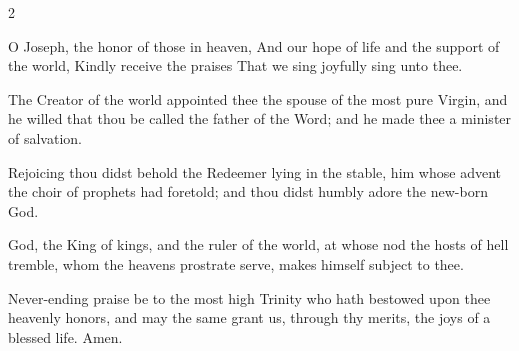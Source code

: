 \begin{multicols}{2}
\raggedcolumns
\begin{enpars}
O Joseph, the honor of those in heaven,
And our hope of life and the support of the world,
Kindly receive the praises
That we sing joyfully sing unto thee.

The Creator of the world appointed thee
the spouse of the most pure Virgin, and he
willed that thou be called the father of the
Word; and he made thee a minister of
salvation.

Rejoicing thou didst behold the Redeemer
lying in the stable, him whose advent
the choir of prophets had foretold; and thou
didst humbly adore the new-born God.

God, the King of
kings, and the ruler of the world, at whose
nod the hosts of hell tremble, whom the
heavens prostrate serve, makes himself
subject to thee.

Never-ending praise be to the most
high Trinity who hath bestowed upon
thee heavenly honors, and may the same
grant us, through thy merits, the joys of a blessed life. Amen.
\end{enpars}
\end{multicols}
